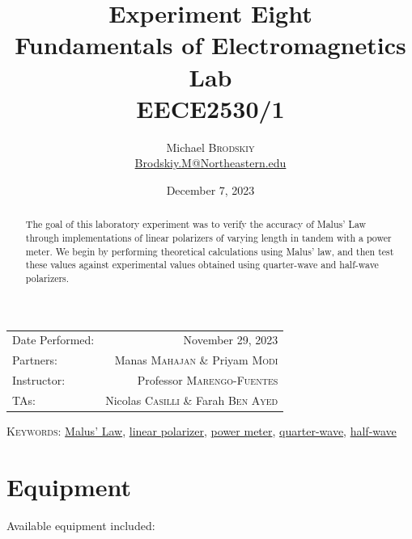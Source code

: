 \documentclass[
	letterpaper, %
	10pt, %
]{CSUniSchoolLabReport}
\title{Experiment Eight\\ Fundamentals of Electromagnetics Lab \\ EECE2530/1} %
\author{Michael \textsc{Brodskiy}\\ \small \href{mailto:Brodskiy.M@Northeastern.edu}{Brodskiy.M@Northeastern.edu}}
\date{December 7, 2023} %
\begin{document}
\maketitle %

\begin{center}
	\begin{tabular}{l r}
		Date Performed: & November 29, 2023 \\ %
        Partners: & Manas \textsc{Mahajan} \& Priyam \textsc{Modi} \\ %
		Instructor: & Professor \textsc{Marengo-Fuentes} \\ %
        TAs: & Nicolas \textsc{Casilli} \& Farah \textsc{Ben Ayed} \\ %
	\end{tabular}
\end{center}

\newpage

\begin{abstract}

  The goal of this laboratory experiment was to verify the accuracy of Malus' Law through implementations of linear polarizers of varying length in tandem with a power meter. We begin by performing theoretical calculations using Malus' law, and then test these values against experimental values obtained using quarter-wave and half-wave polarizers.

\end{abstract}

\begin{flushleft}

  \textsc{Keywords:} \underline{Malus' Law}, \underline{linear polarizer}, \underline{power meter}, \underline{quarter-wave}, \underline{half-wave}

\end{flushleft}

\newpage

\section{Equipment}

\hspace{.5 in} Available equipment included:\\
\end{document}
